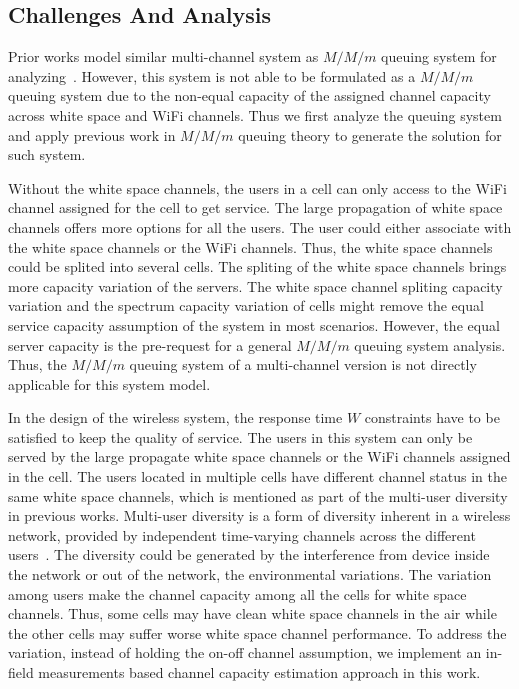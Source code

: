 \subsection{Challenges And Analysis}
\label{subsec:challenge}
Prior works model similar multi-channel system as $M/M/m$ queuing system for analyzing~\cite{bodas2012low}.
However, this system is not able to be formulated as a $M/M/m$ queuing system due to the 
non-equal capacity of the assigned channel capacity across white space and WiFi channels.
Thus we first analyze the queuing system and apply previous work in $M/M/m$ queuing theory to 
generate the solution for such system.

Without the white space channels, the users in a cell can only access to the WiFi channel assigned for the 
cell to get service. The large propagation of white space channels offers more options for all the users. 
The user could either associate with the white space channels or the WiFi channels. 
Thus, the white space channels could be splited into several cells. 
The spliting of the white space channels brings more capacity variation of the servers. 
The white space channel spliting capacity variation and the spectrum capacity variation of cells might remove the 
equal service capacity assumption of the system in most scenarios.
However, the equal server capacity is the pre-request for a general $M/M/m$ queuing system analysis.
Thus, the $M/M/m$ queuing system of a multi-channel version is not directly applicable for this system model.



In the design of the wireless system, the response time $W$ constraints have to be satisfied to keep the 
quality of service. 
The users in this system can only be served by the large propagate white space channels or the WiFi 
channels assigned in the cell. 
The users located in multiple cells have different channel status in the same white space channels, 
which is mentioned as part of the multi-user diversity in previous works. Multi-user diversity is a 
form of diversity inherent in a wireless network, provided by independent time-varying channels across 
the different users~\cite{viswanath2002opportunistic}. 
The diversity could be generated by the interference from device inside the network or out of the network, 
the environmental variations.  
The variation among users make the channel capacity among all the cells for white space channels. 
Thus, some cells may have clean white space channels in the air while the other cells may suffer 
worse white space channel performance. 
To address the variation, instead of holding the on-off channel assumption, we implement an in-field 
measurements based channel capacity estimation approach in this work.

